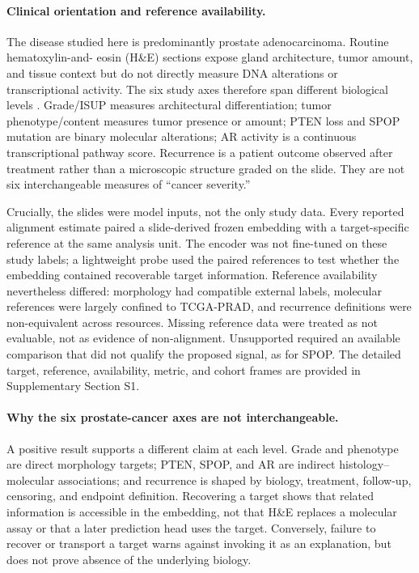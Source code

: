\paragraph{Clinical orientation and reference availability.}
The disease studied here is predominantly prostate adenocarcinoma. Routine hematoxylin-and-
eosin (H\&E) sections expose gland architecture, tumor amount, and tissue context but do not
directly measure DNA alterations or transcriptional activity. The six study axes therefore
span different biological levels \cite{panda2022,tcgaprad2015,tcgacdr2018}. Grade/ISUP measures
architectural differentiation; tumor phenotype/content measures tumor presence or
amount; PTEN loss and SPOP mutation are binary molecular alterations; AR activity is a
continuous transcriptional pathway score. Recurrence is a patient outcome observed after
treatment rather than a microscopic structure graded on the slide. They are not six
interchangeable measures of ``cancer severity.''

Crucially, the slides were model inputs, not the only study data. Every reported alignment
estimate paired a slide-derived frozen embedding with a target-specific reference at the same
analysis unit. The encoder was not fine-tuned on these study labels; a lightweight probe used
the paired references to test whether the embedding contained recoverable target
information. Reference availability nevertheless differed: morphology had compatible
external labels, molecular references were largely confined to TCGA-PRAD, and recurrence
definitions were non-equivalent across resources. Missing reference data were treated as not
evaluable, not as evidence of non-alignment. Unsupported required an available comparison
that did not qualify the proposed signal, as for SPOP. The detailed target, reference,
availability, metric, and cohort frames are provided in Supplementary Section S1.

\paragraph{Why the six prostate-cancer axes are not interchangeable.}
A positive result supports a different claim at each level. Grade and phenotype are direct
morphology targets; PTEN, SPOP, and AR are indirect histology--molecular associations; and
recurrence is shaped by biology, treatment, follow-up, censoring, and endpoint definition.
Recovering a target shows that related information is accessible in the embedding, not that
H\&E replaces a molecular assay or that a later prediction head uses the target. Conversely,
failure to recover or transport a target warns against invoking it as an explanation, but
does not prove absence of the underlying biology.

